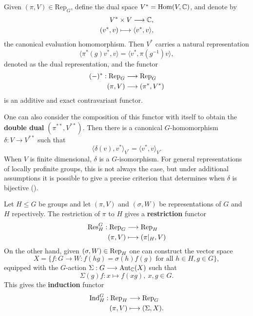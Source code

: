 \begin{defn}
    Given $(\pi,V)\in\mathrm{Rep}_G$, define the dual space $V^*=\mathrm{Hom}(V,\mathbb{C})$, and denote by 
    \begin{align*}
        V^*\times V\longrightarrow \mathbb{C},\\
        (v^*,v)\longmapsto\langle v^*,v\rangle,
    \end{align*}
    the canonical evaluation homomorphism. Then $V^*$ carries a natural representation 
    $$\langle\pi^*(g)v^*,v\rangle=\langle v^*,\pi(g^{-1})v\rangle,$$
    denoted as the dual representation, and the functor 
    \begin{align*}
        (-)^*:\mathrm{Rep}_G&\longrightarrow\mathrm{Rep}_G\\
        (\pi,V)&\longrightarrow(\pi^*,V^*)
    \end{align*}
    is an additive and exact contravariant functor.
\end{defn}

One can also consider the composition of this functor with itself to obtain the \textbf{double dual} $(\pi^{**},V^{**})$. Then there is a canonical $G$-homomorphism $\delta:V\rightarrow V^{**}$ such that $$\langle\delta(v),v^*\rangle_{V^*}=\langle v^*,v\rangle_{V}.$$
When $V$ is finite dimensional, $\delta$ is a $G$-isomorphism. For general representations of locally profinite groups, this is not always the case, but under additional assumptions it is possible to give a precise criterion that determines when $\delta$ is bijective (\cite[2.8 Corollary, 2.9 Proposition]{BH1}).


\begin{defn}
    Let $H\leq G$ be groups and let $(\pi,V)$ and $(\sigma,W)$ be representations of $G$ and $H$ repectively. The restriction of $\pi$ to $H$ gives a \textbf{restriction} functor
    \begin{align*}
        \mathrm{Res}_H^G:\mathrm{Rep}_G&\longrightarrow\mathrm{Rep}_H\\
        (\pi,V)&\longmapsto(\pi|_H,V)
    \end{align*}
    On the other hand, given $(\sigma,W)\in\mathrm{Rep}_H$ one can construct the vector space
    $$X=\{f:G\to W:f(hg)=\sigma(h)f(g)\text{ for all }h\in H, g\in G\},$$
    equipped with the $G$-action $\Sigma:G\longrightarrow\mathrm{Aut}_{\mathbb{C}}(X)$ such that
    $$\Sigma(g)f:x\longmapsto f(xg),\ x,g\in G.$$
    This gives the \textbf{induction} functor
    \begin{align*}
        \mathrm{Ind}_H^G:\mathrm{Rep}_H&\longrightarrow\mathrm{Rep}_G\\
        (\pi,V)&\longmapsto(\Sigma,X).
    \end{align*}
\end{defn}

